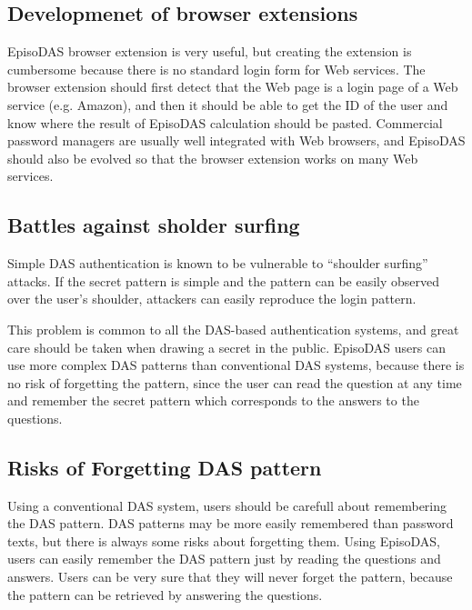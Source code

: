 \documentclass[sigconf]{acmart}
\begin{document}
\subsection{Developmenet of browser extensions}

EpisoDAS browser extension is very useful, but creating the extension
is cumbersome because there is no standard login form for
Web services.
%
The browser extension should first detect that the Web page is a login page
of a Web service (e.g. Amazon),
and then it should be able to get the ID of the user
and know where the result of EpisoDAS calculation should be pasted.
%
Commercial password managers\cite{OnePassword,Dashlane,MilPass,LastPass,KeyPass,NortonIDSafe,IDManager}
are usually well integrated with Web browsers,
and EpisoDAS should also be evolved so that
the browser extension works on many Web services.

\subsection{Battles against sholder surfing}

Simple DAS authentication is known to be vulnerable to ``shoulder surfing''
attacks\cite{Aviv:2017:TBS:3134600.3134609}.
If the secret pattern is simple and
the pattern can be easily observed over the user's shoulder,
attackers can easily reproduce the login pattern.

This problem is common to all the DAS-based authentication systems,
and great care should be taken when drawing a secret in the public.
EpisoDAS users can use more complex DAS patterns than
conventional DAS systems,
because there is no risk of forgetting the pattern,
since the user can read the question at any time and
remember the secret pattern which corresponds to the
answers to the questions.

\subsection{Risks of Forgetting DAS pattern}

Using a conventional DAS system, users should be carefull about
remembering the DAS pattern.
DAS patterns may be more easily remembered than password texts,
but there is always some risks about forgetting them.
Using EpisoDAS, users can easily remember the DAS pattern
just by reading the questions and answers.
Users can be very sure that they will never forget the pattern,
because the pattern can be retrieved by answering the questions.
\end{document}
